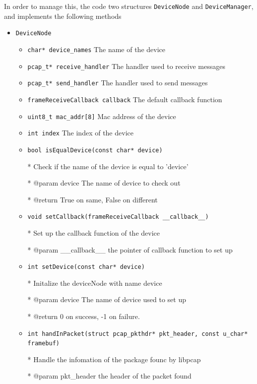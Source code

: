 \documentclass[11pt]{article}
\begin{document}
		In order to manage this, the code two structures \texttt{DeviceNode} and \texttt{DeviceManager}, and implements the following methods
		
		\begin{itemize}
			\item \texttt{DeviceNode}
			
			\begin{itemize}
				\item \texttt{char* device\_names} The name of the device 
				\item \texttt{pcap\_t* receive\_handler} The handler used to receive messages
				\item \texttt{pcap\_t* send\_handler} The handler used to send messages
				\item \texttt{frameReceiveCallback callback} The default callback function
				\item \texttt{uint8\_t mac\_addr[8]} Mac address of the device
				\item \texttt{int index} The index of the device
				\item \texttt{bool isEqualDevice(const char* device)}
				
				* Check if the name of the device is equal to 'device'
				
				* @param device The name of device to check out
				
				* @return True on same, False on different
				
				\item \texttt{void setCallback(frameReceiveCallback \_\_callback\_\_)}
				
				* Set up the callback function of the device
				
				* @param \_\_callback\_\_ the pointer of callback function to set up
				
				\item \texttt{int setDevice(const char* device)}
					
				* Initalize the deviceNode with name device
				
				* @param device The name of device used to set up
				
				* @return 0 on success, -1 on failure. 
				
				\item \texttt{int handInPacket(struct pcap\_pkthdr* pkt\_header, const u\_char* framebuf)}
				
				* Handle the infomation of the package founc by libpcap
				
				* @param pkt\_header the header of the packet found
				

\end{itemize}
\end{itemize}
\end{document}
